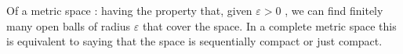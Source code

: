 Of a metric space : having the property
that, given  $  \varepsilon >0 $ , we can find finitely many open
balls of radius  $  \varepsilon  $  that cover the
space.  In a complete metric space this is equivalent to saying that the space is
sequentially compact or just compact.


